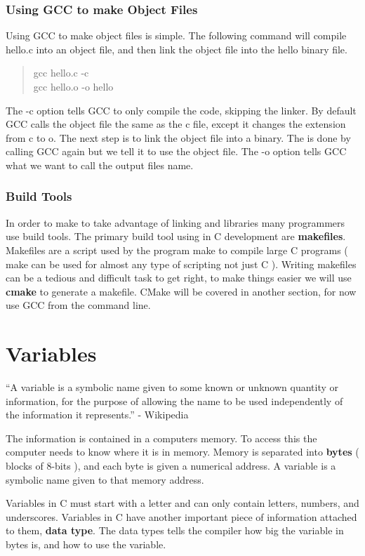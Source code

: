 \documentclass[10pt,a4paper]{paper}
\begin{document}
\subsubsection*{Using GCC to make Object Files}
Using GCC to make object files is simple.  The following command will compile hello.c into an object file, and then link the object file into the hello binary file.

\begin{verse}
gcc hello.c -c \\
gcc hello.o -o hello 
\end{verse} 

The -c option tells GCC to only compile the code, skipping the linker.  By default GCC calls the object file the same as the c file, except it changes the extension from c to o.  The next step is to link the object file into a binary.  The is done by calling GCC again but we tell it to use the object file.  The -o option tells GCC what we want to call the output files name.

\subsubsection*{Build Tools}
In order to make to take advantage of linking and libraries many programmers use build tools.  The primary build tool using in C development are \textbf{makefiles}.  Makefiles are a script used by the program make to compile large C programs ( make can be used for almost any type of scripting not just C ).  Writing makefiles can be a tedious and difficult task to get right, to make things easier we will use \textbf{ cmake } to generate a makefile.  CMake will be covered in another section, for now use GCC from the command line.

\section{Variables}
``A variable is a symbolic name given to some known or unknown quantity or information, for the purpose of allowing the name to be used independently of the information it represents.'' - Wikipedia

The information is contained in a computers memory.  To access this the computer needs to know where it is in memory.  Memory is separated into \textbf{bytes} ( blocks of 8-bits ), and each byte is given a numerical address.  A variable is a symbolic name given to that memory address.    

Variables in C must start with a letter and can only contain letters, numbers, and underscores.  Variables in C have another important piece of information attached to them, \textbf{data type}.  The data types tells the compiler how big the variable in bytes is, and how to use the variable.
\end{document}
